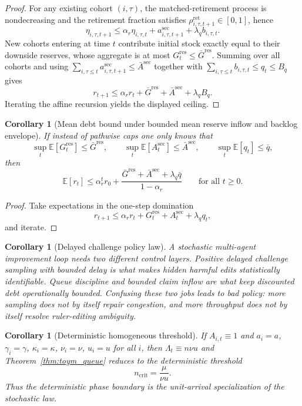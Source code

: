 \documentclass[11pt]{article}
\newtheorem{corollary}[theorem]{Corollary}
\theoremstyle{definition}
\newcommand{\E}{\mathbb{E}}
\newcommand{\1}{\mathbf{1}}
\begin{document}
\begin{proof}
For any existing cohort $(i,\tau)$, the matched-retirement process is nondecreasing and the retirement fraction satisfies $\rho_{i,\tau,t+1}^{\mathrm{ret}}\in[0,1]$, hence
\[
\eta_{i,\tau,t+1}\le \alpha_r\eta_{i,\tau,t}+a_{i,\tau,t+1}^{\mathrm{sec}}+\lambda_q b_{i,\tau,t}.
\]
New cohorts entering at time $t$ contribute initial stock exactly equal to their downside reserves, whose aggregate is at most $G_t^{\mathrm{res}}\le \bar G^{\mathrm{res}}$. Summing over all cohorts and using $\sum_{i,\tau\le t}a_{i,\tau,t+1}^{\mathrm{sec}}\le \bar A^{\mathrm{sec}}$ together with $\sum_{i,\tau\le t}b_{i,\tau,t}\le q_t\le B_q$ gives
\[
r_{t+1}\le \alpha_r r_t + \bar G^{\mathrm{res}} + \bar A^{\mathrm{sec}} + \lambda_q B_q.
\]
Iterating the affine recursion yields the displayed ceiling.
\end{proof}

\begin{corollary}[Mean debt bound under bounded mean reserve inflow and backlog envelope]\label{cor:shadow_debt_mean}
If instead of pathwise caps one only knows that
\[
\sup_t \E[G_t^{\mathrm{res}}]\le \bar G^{\mathrm{res}},
\qquad
\sup_t \E[A_t^{\mathrm{sec}}]\le \bar A^{\mathrm{sec}},
\qquad
\sup_t \E[q_t]\le \bar q,
\]
then
\[
\E[r_t]
\le
\alpha_r^t r_0 + \frac{\bar G^{\mathrm{res}} + \bar A^{\mathrm{sec}} + \lambda_q\bar q}{1-\alpha_r}
\qquad\text{for all }t\ge0.
\]
\end{corollary}

\begin{proof}
Take expectations in the one-step domination
\[
r_{t+1}\le \alpha_r r_t + G_t^{\mathrm{res}} + A_t^{\mathrm{sec}} + \lambda_q q_t,
\]
and iterate.
\end{proof}

\begin{corollary}[Delayed challenge policy law]\label{cor:delayed_challenge_policy}
A stochastic multi-agent improvement loop needs two different control layers. Positive delayed challenge sampling with bounded delay is what makes hidden harmful edits statistically identifiable. Queue discipline and bounded claim inflow are what keep discounted debt operationally bounded. Confusing these two jobs leads to bad policy: more sampling does not by itself repair congestion, and more throughput does not by itself resolve ruler-editing ambiguity.
\end{corollary}

\begin{corollary}[Deterministic homogeneous threshold]\label{cor:toym_det_threshold}
If $A_{i,t}\equiv 1$ and $a_i=a$, $\gamma_i=\gamma$, $\kappa_i=\kappa$, $\nu_i=\nu$, $u_i=u$ for all $i$, then $\Lambda_t\equiv n\nu u$ and Theorem~\ref{thm:toym_queue} reduces to the deterministic threshold
\[
n_{\mathrm{crit}} = \frac{\mu}{\nu u}.
\]
Thus the deterministic phase boundary is the unit-arrival specialization of the stochastic law.
\end{corollary}
\end{document}
